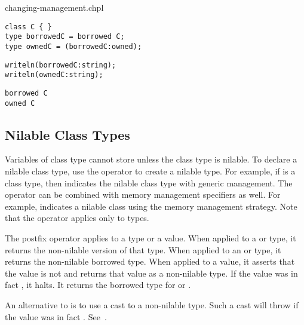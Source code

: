 \begin{chapelexample}{changing-management.chpl}
\begin{chapel}
\begin{verbatim}
class C { }
type borrowedC = borrowed C;
type ownedC = (borrowedC:owned);
\end{verbatim}
\end{chapel}
\begin{chapelpost}
\begin{verbatim}
writeln(borrowedC:string);
writeln(ownedC:string);
\end{verbatim}
\end{chapelpost}
\begin{chapeloutput}
\begin{verbatim}
borrowed C
owned C
\end{verbatim}
\end{chapeloutput}
\end{chapelexample}


\subsection{Nilable Class Types}
\label{Nilable_Classes}

Variables of class type cannot store  unless the class type is
nilable. To declare a nilable class type, use the  operator to
create a nilable type. For example, if  is a class type, then
 indicates the nilable class type with generic management. The
 operator can be combined with memory management specifiers as
well. For example,  indicates a nilable class using the
 memory management strategy. Note that the 
operator applies only to types.

The postfix \chpl{!} operator applies to a type or a value. When applied
to a  or  type, it returns the non-nilable
version of that type. When applied to an  or 
type, it returns the non-nilable borrowed type. When applied to a value,
it asserts that the value is not  and returns that value as a
non-nilable type.  If the value was in fact , it halts.  It
returns the borrowed type for  or .

An alternative to \chpl{!} is to use a cast to a non-nilable type. Such a
cast will throw  if the value was in fact .
See~.

